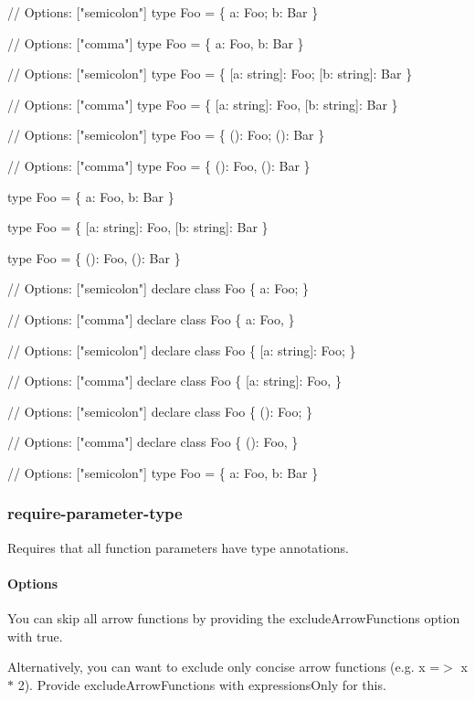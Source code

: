 \begin{DoxyCode}
// Options: ["semicolon"]
type Foo = \{ a: Foo; b: Bar \}

// Options: ["comma"]
type Foo = \{ a: Foo, b: Bar \}

// Options: ["semicolon"]
type Foo = \{ [a: string]: Foo; [b: string]: Bar \}

// Options: ["comma"]
type Foo = \{ [a: string]: Foo, [b: string]: Bar \}

// Options: ["semicolon"]
type Foo = \{ (): Foo; (): Bar \}

// Options: ["comma"]
type Foo = \{ (): Foo, (): Bar \}

type Foo = \{ a: Foo, b: Bar \}

type Foo = \{ [a: string]: Foo, [b: string]: Bar \}

type Foo = \{ (): Foo, (): Bar \}

// Options: ["semicolon"]
declare class Foo \{ a: Foo; \}

// Options: ["comma"]
declare class Foo \{ a: Foo, \}

// Options: ["semicolon"]
declare class Foo \{ [a: string]: Foo; \}

// Options: ["comma"]
declare class Foo \{ [a: string]: Foo, \}

// Options: ["semicolon"]
declare class Foo \{ (): Foo; \}

// Options: ["comma"]
declare class Foo \{ (): Foo, \}

// Options: ["semicolon"]
type Foo = \{ a: Foo, b: Bar \}
\end{DoxyCode}


\label{_eslint-plugin-flowtype-rules-require-parameter-type}%
 \subsubsection*{{\ttfamily require-\/parameter-\/type}}

Requires that all function parameters have type annotations.

\label{_eslint-plugin-flowtype-rules-require-parameter-type-options}%
 \paragraph*{Options}

You can skip all arrow functions by providing the {\ttfamily exclude\+Arrow\+Functions} option with {\ttfamily true}.

Alternatively, you can want to exclude only concise arrow functions (e.\+g. {\ttfamily x =$>$ x $\ast$ 2}). Provide {\ttfamily exclude\+Arrow\+Functions} with {\ttfamily expressions\+Only} for this.


